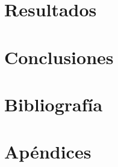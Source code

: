 \documentclass[12pt,titlepage,twoside,openright]{book}
\begin{document}
\chapter{Resultados}
\label{cap:resultados}

\chapter{Conclusiones}
\label{cap:conclusiones}

\backmatter

\chapter{Bibliografía}
\label{cap:bibleografia}



\appendix
\chapter{Apéndices}
\label{ap:apendices}
\end{document}
